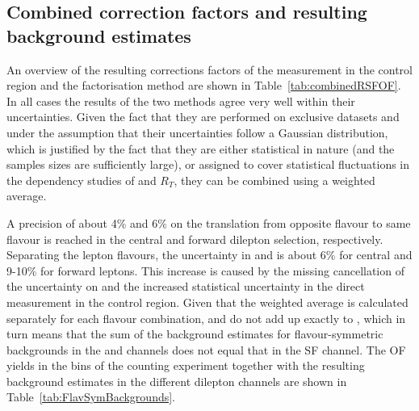 \subsection{Combined correction factors and resulting background estimates}
\label{sec:combinedRSFOF}
An overview of the resulting corrections factors of the measurement in the control region and the factorisation method are shown in Table~\ref{tab:combinedRSFOF}. In all cases the results of the two methods agree very well within their uncertainties. Given the fact that they are performed on exclusive datasets and under the assumption that their uncertainties follow a Gaussian distribution, which is justified by the fact that they are either statistical in nature (and the samples sizes are sufficiently large), or assigned to cover statistical fluctuations in the dependency studies of \rmue and $R_T$, they can be combined using a weighted average. 
 
A precision of about 4\% and 6\% on the translation from opposite flavour to same flavour is reached in the central and forward dilepton selection, respectively. Separating the lepton flavours, the uncertainty in \Reeof and \Rmmof is about 6\% for central and 9-10\% for forward leptons. This increase is caused by the missing cancellation of the uncertainty on \rmue and the increased statistical uncertainty in the direct measurement in the control region. Given that the weighted average is calculated separately for each flavour combination, \Reeof and \Rmmof do not add up exactly to \Rsfof, which in turn means that the sum of the background estimates for flavour-symmetric backgrounds in the \EE and \MM channels does not equal that in the SF channel. The OF yields in the \mll bins of the counting experiment together with the resulting background estimates in the different dilepton channels are shown in Table~\ref{tab:FlavSymBackgrounds}. 





